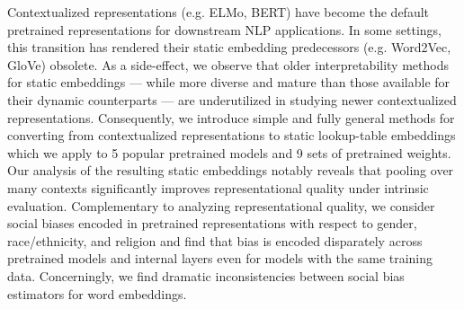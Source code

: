 Contextualized representations (e.g. ELMo, BERT) have become the default pretrained representations for downstream NLP applications. In some settings, this transition has rendered their static embedding predecessors (e.g. Word2Vec, GloVe) obsolete. As a side-effect, we observe that older interpretability methods for static embeddings --- while more diverse and mature than those available for their dynamic counterparts --- are underutilized in studying newer contextualized representations.  Consequently, we introduce simple and fully general methods for converting from contextualized representations to static lookup-table embeddings which we apply to 5 popular pretrained models and 9 sets of pretrained weights. Our analysis of the resulting static embeddings notably reveals that pooling over many contexts significantly improves representational quality under intrinsic evaluation. Complementary to analyzing representational quality, we consider social biases encoded in pretrained representations with respect to gender, race/ethnicity, and religion and find that bias is encoded disparately across pretrained models and internal layers even for models with the same training data. Concerningly, we find dramatic inconsistencies between social bias estimators for word embeddings.
